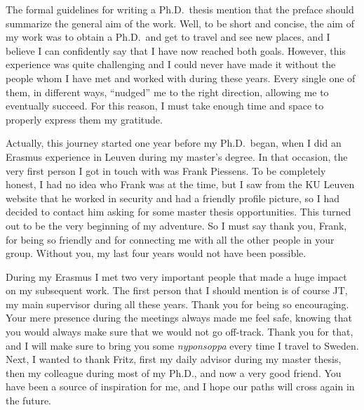 The formal guidelines for writing a Ph.D.\ thesis mention that the preface
should summarize the general aim of the work. Well, to be short and concise, the
aim of my work was to obtain a Ph.D.\ and get to travel and see new places, and
I believe I can confidently say that I have now reached both goals. However,
this experience was quite challenging and I could never have made it without the
people whom I have met and worked with during these years. Every single one of
them, in different ways, ``nudged'' me to the right direction, allowing me to
eventually succeed. For this reason, I must take enough time and space to
properly express them my gratitude.

Actually, this journey started one year before my Ph.D.\ began, when I did an
Erasmus experience in Leuven during my master's degree. In that occasion, the
very first person I got in touch with was Frank Piessens. To be completely
honest, I had no idea who Frank was at the time, but I saw from the KU Leuven
website that he worked in security and had a friendly profile picture, so I had
decided to contact him asking for some master thesis opportunities. This turned
out to be the very beginning of my adventure. So I must say thank you, Frank,
for being so friendly and for connecting me with all the other people in your
group. Without you, my last four years would not have been possible.

During my Erasmus I met two very important people that made a huge
impact on my subsequent work. The first person that I should mention is of
course JT, my main supervisor during all these years. Thank you for being so
encouraging. Your mere presence during the meetings always made me feel safe,
knowing that you would always make sure that we would not go off-track. Thank
you for that, and I will make sure to bring you some
\emph{nyponsoppa}
every time I travel to Sweden. Next, I wanted to thank Fritz, first my daily
advisor during my master thesis, then my colleague during most of my Ph.D., and
now a very good friend. You have been a source of inspiration for me, and I hope
our paths will cross again in the future.

